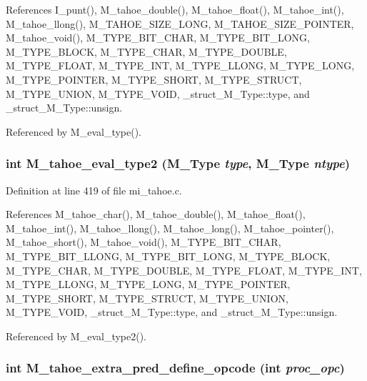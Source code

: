 References I\_\-punt(), M\_\-tahoe\_\-double(), M\_\-tahoe\_\-float(), M\_\-tahoe\_\-int(), M\_\-tahoe\_\-llong(), M\_\-TAHOE\_\-SIZE\_\-LONG, M\_\-TAHOE\_\-SIZE\_\-POINTER, M\_\-tahoe\_\-void(), M\_\-TYPE\_\-BIT\_\-CHAR, M\_\-TYPE\_\-BIT\_\-LONG, M\_\-TYPE\_\-BLOCK, M\_\-TYPE\_\-CHAR, M\_\-TYPE\_\-DOUBLE, M\_\-TYPE\_\-FLOAT, M\_\-TYPE\_\-INT, M\_\-TYPE\_\-LLONG, M\_\-TYPE\_\-LONG, M\_\-TYPE\_\-POINTER, M\_\-TYPE\_\-SHORT, M\_\-TYPE\_\-STRUCT, M\_\-TYPE\_\-UNION, M\_\-TYPE\_\-VOID, \_\-struct\_\-M\_\-Type::type, and \_\-struct\_\-M\_\-Type::unsign.

Referenced by M\_\-eval\_\-type().
\subsubsection{\setlength{\rightskip}{0pt plus 5cm}int M\_\-tahoe\_\-eval\_\-type2 (\bf{M\_\-Type} {\em type}, \bf{M\_\-Type} {\em ntype})}\label{m__tahoe_8h_2f106a7d6fd7ae02a53d7383812ac777}




Definition at line 419 of file mi\_\-tahoe.c.

References M\_\-tahoe\_\-char(), M\_\-tahoe\_\-double(), M\_\-tahoe\_\-float(), M\_\-tahoe\_\-int(), M\_\-tahoe\_\-llong(), M\_\-tahoe\_\-long(), M\_\-tahoe\_\-pointer(), M\_\-tahoe\_\-short(), M\_\-tahoe\_\-void(), M\_\-TYPE\_\-BIT\_\-CHAR, M\_\-TYPE\_\-BIT\_\-LLONG, M\_\-TYPE\_\-BIT\_\-LONG, M\_\-TYPE\_\-BLOCK, M\_\-TYPE\_\-CHAR, M\_\-TYPE\_\-DOUBLE, M\_\-TYPE\_\-FLOAT, M\_\-TYPE\_\-INT, M\_\-TYPE\_\-LLONG, M\_\-TYPE\_\-LONG, M\_\-TYPE\_\-POINTER, M\_\-TYPE\_\-SHORT, M\_\-TYPE\_\-STRUCT, M\_\-TYPE\_\-UNION, M\_\-TYPE\_\-VOID, \_\-struct\_\-M\_\-Type::type, and \_\-struct\_\-M\_\-Type::unsign.

Referenced by M\_\-eval\_\-type2().
\subsubsection{\setlength{\rightskip}{0pt plus 5cm}int M\_\-tahoe\_\-extra\_\-pred\_\-define\_\-opcode (int {\em proc\_\-opc})}\label{m__tahoe_8h_dcd24d2a3a178991a035525ed9156b70}




